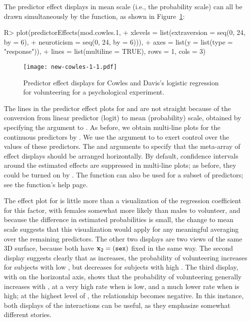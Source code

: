 \documentclass[article]{jss}
\newcommand{\x}{\mathbf{x}}
\begin{document}
The predictor effect displays in mean scale (i.e., the probability
scale) can all be drawn simultaneously by the 
function, as shown in Figure~\ref{new-cowles-1}:
%
\begin{Schunk}
\begin{Sinput}
R> plot(predictorEffects(mod.cowles.1,
+    xlevels = list(extraversion = seq(0, 24, by = 6),
+    neuroticism = seq(0, 24, by = 6))),
+    axes = list(y = list(type = "response")),
+    lines = list(multiline = TRUE), rows = 1, cols = 3)
\end{Sinput}
\end{Schunk}
%
\begin{figure}[t!]
  \centering
    \texttt{[image: new-cowles-1-1.pdf]}
  \caption{Predictor effect displays for Cowles and Davis's logistic regression for volunteering for a psychological experiment.}\label{new-cowles-1}
\end{figure}
The lines in the predictor effect plots for  and  are not straight because of the conversion from linear predictor (logit) to mean (probability) scale, obtained by specifying the argument  to . As before, we obtain multi-line plots for the continuous predictors by . We use the  argument to  to exert control over the values of these predictors. The  and  arguments to  specify that the meta-array of effect displays should be arranged horizontally.  By default, confidence intervals around the estimated effects are suppressed in multi-line plots; as before, they could be turned on by . The  function can also be used for a subset of predictors; see the function's help page.

The effect plot for  is little more than a visualization of the regression coefficient for this factor, with females somewhat more likely than males to volunteer, and because the difference in estimated probabilities is small, the change to mean scale suggests that this visualization would apply for any meaningful averaging over the remaining predictors.  The other two displays are two views of the same 3D surface, because both have $\x_2 = (\mbox{\code{sex}})$ fixed in the same way.  The second display suggests clearly that as  increases, the probability of volunteering increases for subjects with low , but decreases for subjects with high .  The third display, with  on the horizontal axis, shows that the probability of volunteering generally increases with , at a very high rate when  is low, and a much lower rate when  is high; at the highest level of , the relationship becomes negative.  In this instance, both displays of the interactions can be useful, as they emphasize somewhat different stories.
\end{document}
